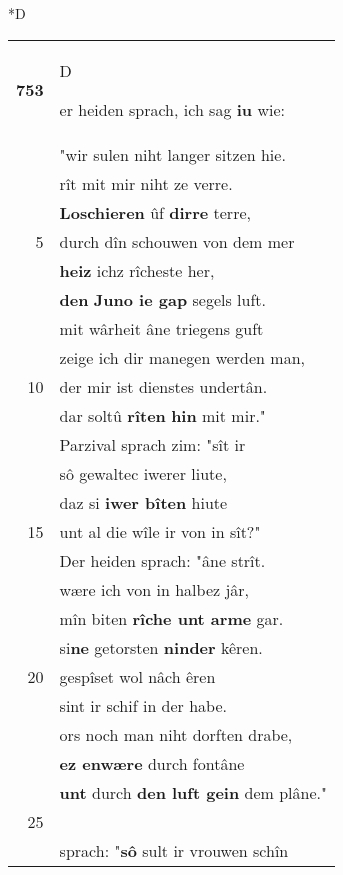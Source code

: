 \documentclass[8pt,a4paper,notitlepage]{article}
\begin{document}
\begin{table}[ht]
\begin{minipage}[t]{0.5\linewidth}
\small
\begin{center}*D
\end{center}
\begin{tabular}{rl}
\textbf{753} & \begin{large}D\end{large}er heiden sprach, ich sag \textbf{iu} wie:\\ 
 & "wir sulen niht langer sitzen hie.\\ 
 & rît mit mir niht ze verre.\\ 
 & \textbf{Loschieren} ûf \textbf{dirre} terre,\\ 
5 & durch dîn schouwen von dem mer\\ 
 & \textbf{heiz} ichz rîcheste her,\\ 
 & \textbf{den} \textbf{Juno ie gap} segels luft.\\ 
 & mit wârheit âne triegens guft\\ 
 & zeige ich dir manegen werden man,\\ 
10 & der mir ist dienstes undertân.\\ 
 & dar soltû \textbf{rîten} \textbf{hin} mit mir."\\ 
 & Parzival sprach zim: "sît ir\\ 
 & sô gewaltec iwerer liute,\\ 
 & daz si \textbf{iwer bîten} hiute\\ 
15 & unt al die wîle ir von in sît?"\\ 
 & Der heiden sprach: "âne strît.\\ 
 & wære ich von in halbez jâr,\\ 
 & mîn biten \textbf{rîche unt arme} gar.\\ 
 & si\textbf{ne} getorsten \textbf{ninder} kêren.\\ 
20 & gespîset wol nâch êren\\ 
 & sint ir schif in der habe.\\ 
 & ors noch man niht dorften drabe,\\ 
 & \textbf{ez enwære} durch fontâne\\ 
 & \textbf{unt} durch \textbf{den luft gein} dem plâne."\\ 
25 & \textit{\begin{large}P\end{large}}arzival zem bruoder sîn\\ 
 & sprach: "\textbf{sô} sult ir vrouwen schîn\\ 

\end{tabular}
\end{minipage}
\end{table}
\end{document}

